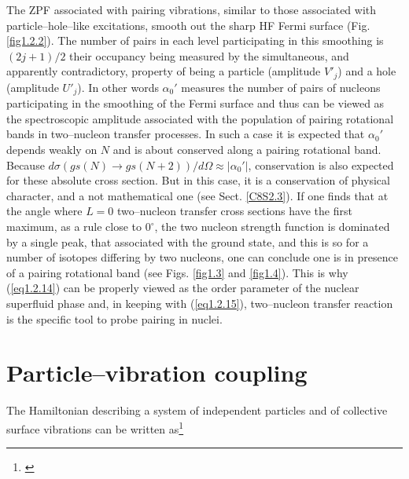 The ZPF associated with pairing vibrations, similar to those associated with particle--hole--like excitations,  smooth out the sharp HF Fermi surface (Fig. \ref{fig1.2.2}). The number of pairs in each level participating in this smoothing is $(2j+1)/2$ their occupancy being measured by the simultaneous, and apparently contradictory, property of being a particle (amplitude $V'_j$) and a hole (amplitude $U'_j$). In other words $\alpha_0'$ measures the number of pairs of nucleons participating in the smoothing of the Fermi surface and thus can be viewed as the spectroscopic amplitude associated with the population of pairing rotational bands in two--nucleon transfer processes. In such a case it is expected that $\alpha_0'$ depends weakly on $N$ and is about conserved along a pairing rotational band. Because $d\sigma(gs(N)\rightarrow gs(N+2))/d\Omega\approx|\alpha_0'|$, conservation is also expected for these absolute cross section. But in this case, it is a conservation of physical character, and a not mathematical one (see Sect. \ref{C8S2.3}). If one finds that at the angle where $L=0$ two--nucleon transfer cross sections have the first maximum, as a rule close to $0^\circ$, the two nucleon strength function is dominated by a single peak, that associated with the ground state, and this is so for a number of isotopes differing by two nucleons, one can conclude one is in presence of a pairing rotational band (see Figs. \ref{fig1.3} and \ref{fig1.4}). This is why (\ref{eq1.2.14}) can be properly viewed as the order parameter of the nuclear superfluid phase and, in keeping with (\ref{eq1.2.15}), two--nucleon transfer reaction is the specific tool to probe pairing in nuclei.
\section{Particle--vibration coupling}\label{appintroD}
The Hamiltonian describing a system of independent particles and of collective surface vibrations can be written as\footnote{\cite{Bohr:75,Brink:05}}

